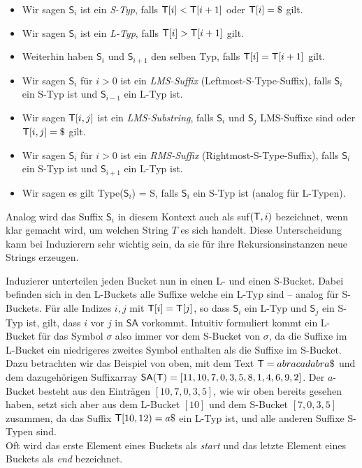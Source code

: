 \begin{itemize}
\item Wir sagen $\mathsf{S}_i$ ist ein \textit{S-Typ}, falls $\inputtext[i] < \inputtext{}[i+1]$ oder $\inputtext[i] = \$$ gilt.
\item Wir sagen $\mathsf{S}_i$ ist ein \textit{L-Typ}, falls $\inputtext[i] > \inputtext{}[i+1]$ gilt.
\item Weiterhin haben $\mathsf{S}_i$ und $\mathsf{S}_{i+1}$ den selben Typ, falls $\inputtext[i] = \inputtext[i+1]$ gilt.
\item Wir sagen $\mathsf{S}_i$ für $i > 0$ ist ein \textit{LMS-Suffix} (Leftmost-S-Type-Suffix), falls $\mathsf{S}_i$ ein S-Typ ist und $\mathsf{S}_{i-1}$ ein L-Typ ist.
\item Wir sagen $\inputtext{}[i,j]$ ist ein \textit{LMS-Substring}, falls $\mathsf{S}_i$ und $\mathsf{S}_j$ LMS-Suffixe sind oder $\inputtext{}[i,j] = \$$ gilt.
\item Wir sagen $\mathsf{S}_i$ für $i > 0$ ist ein \textit{RMS-Suffix} (Rightmost-S-Type-Suffix), falls $\mathsf{S}_i$ ein S-Typ ist und $\mathsf{S}_{i+1}$ ein L-Typ ist.
\item Wir sagen es gilt Type($\mathsf{S}_i$) = S, falls $\mathsf{S}_i$ ein S-Typ ist (analog für L-Typen).
\end{itemize}

Analog wird das Suffix $\mathsf{S}_i$ in diesem Kontext auch als suf$(\inputtext,i)$ bezeichnet, wenn klar gemacht wird, um welchen String $T$ es sich handelt. Diese Unterscheidung kann bei Induzierern sehr wichtig sein, da sie für ihre Rekursionsinstanzen neue Strings erzeugen.

Induzierer unterteilen jeden Bucket nun in einen L- und einen S-Bucket. Dabei befinden sich in den L-Buckets alle Suffixe welche ein L-Typ sind -- analog für S-Buckets. Für alle Indizes $i,j$ mit $\inputtext{}[i] = \inputtext{}[j]$, so dass $\mathsf{S}_i$ ein L-Typ und $\mathsf{S}_j$ ein S-Typ ist, gilt, dass $i$ vor $j$ in $\mathsf{SA}$ vorkommt. Intuitiv formuliert kommt ein L-Bucket für das Symbol $\sigma$ also immer vor dem S-Bucket von $\sigma$, da die Suffixe im L-Bucket ein niedrigeres zweites Symbol enthalten als die Suffixe im S-Bucket. \\
Dazu betrachten wir das Beispiel von oben, mit dem Text $\inputtext = abracadabra\$$ und dem dazugehörigen Suffixarray $\mathsf{SA}(\inputtext) = [11, 10, 7, 0, 3, 5, 8, 1, 4, 6, 9, 2]$. Der $a$-Bucket besteht aus den Einträgen $[10,7,0,3,5]$, wie wir oben bereits gesehen haben, setzt sich aber aus dem L-Bucket $[10]$ und dem S-Bucket $[7,0,3,5]$ zusammen, da das Suffix $\inputtext{}[10,12) = a\$$ ein L-Typ ist, und alle anderen Suffixe S-Typen sind. \\
Oft wird das erste Element eines Buckets als \textit{start} und das letzte Element eines Buckets als \textit{end} bezeichnet. \\

